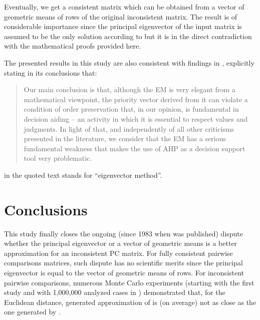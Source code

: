\documentclass [12pt]{article}
\theoremstyle{definition}
\begin{document}
Eventually, we get a consistent matrix which can be obtained from a vector of geometric means of rows of the original inconsistent matrix.
The result is of considerable importance since the principal eigenvector of the input matrix is assumed to be the only  solution according to \cite{Saaty77} but it is in the direct contradiction with the mathematical proofs provided here.

The presented results in this study are also consistent with findings in \cite{BV2004}, explicitly stating in its conclusions that:

\begin{quotation}
Our main conclusion
is that, although the EM is very elegant from
a mathematical viewpoint, the priority vector
derived from it can violate a condition of order preservation
that, in our opinion, is fundamental in
decision aiding -- an activity in which it is essential
to respect values and judgments. In light of that,
and independently of all other criticisms presented
in the literature, we consider that the EM has a serious
fundamental weakness that makes the use of
AHP as a decision support tool very problematic.
\end{quotation}  in the quoted text stands for ``eigenvector method''.

\section{Conclusions}

This study finally closes the ongoing (since 1983 when \cite{Jensen84} was published) dispute whether the principal eigenvector or a vector of geometric means is a better approximation for an inconsistent PC matrix.
For fully consistent pairwise comparisons matrices, such dispute has no scientific merits since the principal eigenvector  is equal to the vector  of geometric means of rows. For inconsistent pairwise comparisons, numerous Monte Carlo experiments (starting with the first study \cite{Jensen84} and with 1,000,000 analyzed cases in \cite{HK1996b}) demonstrated that, for the Euclidean distance, generated approximation of  is (on average) not as close as the one generated by .
\end{document}
